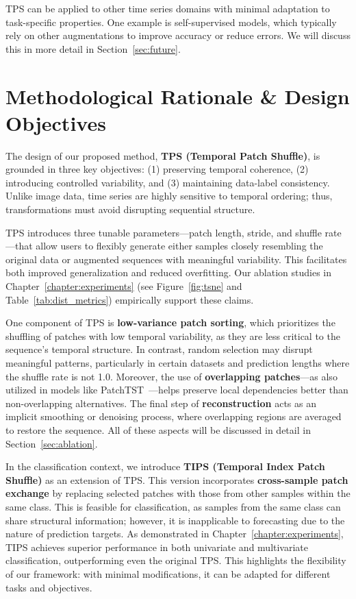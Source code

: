 TPS can be applied to other time series domains with minimal adaptation to task-specific properties. One example is self-supervised models, which typically rely on other augmentations to improve accuracy or reduce errors. We will discuss this in more detail in Section~\ref{sec:future}.


\section{Methodological Rationale \& Design Objectives} \label{sec:method_design}

The design of our proposed method, \textbf{TPS (Temporal Patch Shuffle)}, is grounded in three key objectives: (1) preserving temporal coherence, (2) introducing controlled variability, and (3) maintaining data-label consistency. Unlike image data, time series are highly sensitive to temporal ordering; thus, transformations must avoid disrupting sequential structure.

TPS introduces three tunable parameters—patch length, stride, and shuffle rate—that allow users to flexibly generate either samples closely resembling the original data or augmented sequences with meaningful variability. This facilitates both improved generalization and reduced overfitting. Our ablation studies in Chapter~\ref{chapter:experiments} (see Figure~\ref{fig:tsne} and Table~\ref{tab:dist_metrics}) empirically support these claims.

One component of TPS is \textbf{low-variance patch sorting}, which prioritizes the shuffling of patches with low temporal variability, as they are less critical to the sequence’s temporal structure. In contrast, random selection may disrupt meaningful patterns, particularly in certain datasets and prediction lengths where the shuffle rate is not 1.0. Moreover, the use of \textbf{overlapping patches}—as also utilized in models like PatchTST~\cite{nie2023timeseriesworth64}—helps preserve local dependencies better than non-overlapping alternatives. The final step of \textbf{reconstruction} acts as an implicit smoothing or denoising process, where overlapping regions are averaged to restore the sequence. All of these aspects will be discussed in detail in Section~\ref{sec:ablation}.

In the classification context, we introduce \textbf{TIPS (Temporal Index Patch Shuffle)} as an extension of TPS. This version incorporates \textbf{cross-sample patch exchange} by replacing selected patches with those from other samples within the same class. This is feasible for classification, as samples from the same class can share structural information; however, it is inapplicable to forecasting due to the nature of prediction targets. As demonstrated in Chapter~\ref{chapter:experiments}, TIPS achieves superior performance in both univariate and multivariate classification, outperforming even the original TPS. This highlights the flexibility of our framework: with minimal modifications, it can be adapted for different tasks and objectives.

